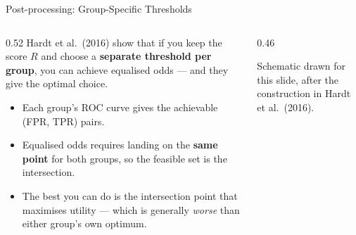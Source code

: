 \begin{frame}{Post-processing: Group-Specific Thresholds}

    \begin{columns}[T]
        \begin{column}{0.52\textwidth}
            Hardt et al.\ (2016) show that if you keep the score $R$ and choose a
            \textbf{separate threshold per group}, you can achieve equalised odds --- and they give
            the optimal choice.

            \vspace{0.6em}
            \begin{itemize}\scriptsize
                \setlength\itemsep{0.3em}
                \item Each group's ROC curve gives the achievable (FPR, TPR) pairs.
                \item Equalised odds requires landing on the \textbf{same point} for both groups,
                      so the feasible set is the intersection.
                \item The best you can do is the intersection point that maximises utility ---
                      which is generally \emph{worse} than either group's own optimum.
            \end{itemize}
        \end{column}
        \begin{column}{0.46\textwidth}
            \centering
            \vspace{0.2em}
            {\scriptsize Schematic drawn for this slide, after the construction in Hardt et al.\ (2016).}
        \end{column}
    \end{columns}


\end{frame}
